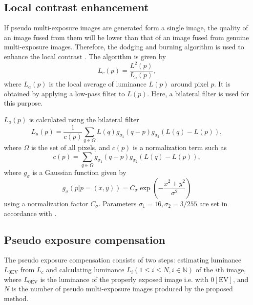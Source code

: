 \documentclass[paper]{ieice}
\begin{document}
\subsection{Local contrast enhancement}
  If pseudo multi-exposure images are generated form a single image,
  the quality of an image fused from them will be lower than
  that of an image fused from genuine multi-exposure images.
  Therefore, the dodging and burning algorithm is used to enhance
  the local contrast \cite{huo2013dodging}.
  The algorithm is given by
  \begin{equation}
    L_c(p) = \frac{L^2(p)}{L_a(p)},
    \label{eq:dodgingAndBurning}
  \end{equation}
  where $L_a(p)$ is the local average of luminance $L(p)$ around pixel $p$.
  It is obtained by applying a low-pass filter to $L(p)$.
  Here, a bilateral filter is used for this purpose.

  $L_a(p)$ is calculated using the bilateral filter
  \begin{equation}
    L_a(p) = \frac{1}{c(p)}
              \sum_{q \in \Omega}
                L(q) g_{\sigma_1}(q-p) g_{\sigma_2}(L(q) - L(p)),
    \label{eq:bilateral}
  \end{equation}
  where $\Omega$ is the set of all pixels, and $c(p)$ is a normalization term such as
  \begin{equation}
    c(p) = \sum_{q \in \Omega} g_{\sigma_1}(q-p) g_{\sigma_2}(L(q) - L(p)),
    \label{eq:normalizingConst}
  \end{equation}
  where $g_{\sigma}$ is a Gaussian function given by
  \begin{equation}
    g_{\sigma}(p | p=(x,y)) = C_{\sigma}\exp \left( -\frac{x^2 + y^2}{\sigma^2} \right)
    \label{eq:gaussian}
  \end{equation}
  using a normalization factor $C_{\sigma}$.
  Parameters $\sigma_1 = 16, \sigma_2 = 3/255$ are set in accordance with \cite{huo2013dodging}.
%
\subsection{Pseudo exposure compensation}
  The pseudo exposure compensation consists of two steps:
  estimating luminance $L_{0 \mathrm{EV}}$ from $L_c$
  and calculating luminance $L_i (1 \le i \le N, i \in \mathbb{N})$ of the $i$th image,
  where $L_{0 \mathrm{EV}}$ is the luminance of the properly exposed image
  i.e. with $0 \mathrm{[EV]}$, and $N$ is the number of pseudo multi-exposure images
  produced by the proposed method.
\end{document}
